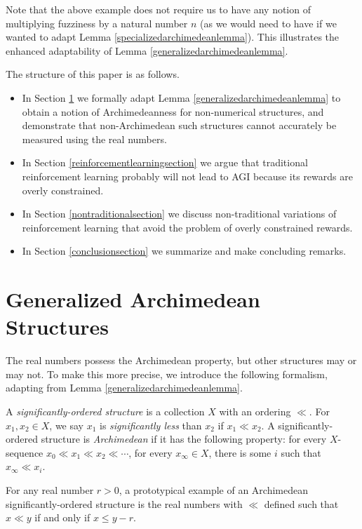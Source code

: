 \documentclass[twoside,11pt]{article}
\begin{document}
Note that the above example does not require us to have any notion
of multiplying fuzziness by a natural number $n$ (as we would need to have
if we wanted to adapt Lemma \ref{specializedarchimedeanlemma}).
This illustrates the enhanced adaptability of Lemma \ref{generalizedarchimedeanlemma}.

The structure of this paper is as follows.
\begin{itemize}
    \item
    In Section \ref{backgroundsection} we formally adapt
    Lemma \ref{generalizedarchimedeanlemma} to obtain a notion of Archimedeanness
    for non-numerical structures, and demonstrate that non-Archimedean such
    structures cannot accurately be measured using the real numbers.
    \item
    In Section \ref{reinforcementlearningsection} we argue that
    traditional reinforcement learning probably will not lead to AGI because
    its rewards are overly constrained.
    \item
    In Section \ref{nontraditionalsection} we discuss non-traditional
    variations of reinforcement learning that avoid the problem of
    overly constrained rewards.
    \item
    In Section \ref{conclusionsection} we summarize and make concluding remarks.
\end{itemize}


\section{Generalized Archimedean Structures}
\label{backgroundsection}

The real numbers possess the Archimedean property, but other structures
may or may not. To make this more precise,
we introduce the following formalism, adapting from Lemma \ref{generalizedarchimedeanlemma}.

\begin{definition}
\label{archimedeandefn}
    A \emph{significantly-ordered structure} is a collection $X$ with
    an ordering $\ll$.
    For $x_1,x_2\in X$, we say $x_1$ is \emph{significantly less}
    than $x_2$ if $x_1\ll x_2$.
    A significantly-ordered structure is \emph{Archimedean} if it
    has the following property: for every $X$-sequence
    $x_0\ll x_1\ll x_2 \ll \cdots$,
    for every $x_\infty\in X$, there is some $i$ such that $x_\infty\ll x_i$.
\end{definition}

For any real number $r>0$, a prototypical example of an Archimedean
significantly-ordered structure is the real
numbers with $\ll$ defined such that
$x\ll y$ if and only if $x\leq y-r$.
\end{document}
